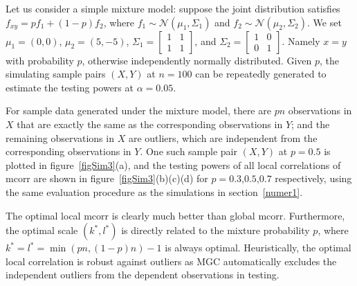 \documentclass[11pt]{article}
\providecommand{\mc}[1]{\mathcal{#1}}
\begin{document}
Let us consider a simple mixture model: suppose the joint distribution satisfies $f_{xy}=p f_{1}+(1-p) f_{2}$, where $f_{1} \sim \mc{N}(\mu_{1},\Sigma_{1})$ and $f_{2} \sim \mc{N}(\mu_{2},\Sigma_{2})$. We set $\mu_{1}=(0,0)$, $\mu_{2}=(5,-5)$, $\Sigma_{1} = \begin{bmatrix} 1&1\\ 1&1 \end{bmatrix}$, and $\Sigma_{2} = \begin{bmatrix} 1&0\\ 0&1 \end{bmatrix}$. Namely $x=y$ with probability $p$, otherwise independently normally distributed. Given $p$, the simulating sample pairs $(X,Y)$ at $n=100$ can be repeatedly generated to estimate the testing powers at $\alpha=0.05$. 
%
%
%
%
%
%
%
%

For sample data generated under the mixture model, there are $pn$ observations in $X$ that are exactly the same as the corresponding observations in $Y$; and the remaining observations in $X$ are outliers, which are independent from the corresponding observations in $Y$. One such sample pair $(X,Y)$ at $p=0.5$ is plotted in figure~\ref{figSim3}(a), and the testing powers of all local correlations of mcorr are shown in figure~\ref{figSim3}(b)(c)(d) for $p=0.3$,$0.5$,$0.7$ respectively, using the same evaluation procedure as the simulations in section~\ref{numer1}.

The optimal local mcorr is clearly much better than global mcorr. Furthermore, the optimal scale $(k^{*},l^{*})$ is directly related to the mixture probability $p$, where $k^{*}=l^{*}=\min(pn,(1-p)n)-1$ is always optimal. Heuristically, the optimal local correlation is robust against outliers as MGC automatically excludes the independent outliers from the dependent observations in testing.
\end{document}
